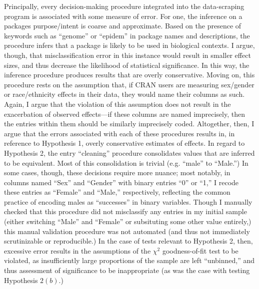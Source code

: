 Principally, every decision-making procedure integrated into the data-scraping program is associated with some measure of error. For one, the inference on a packages purpose/intent is coarse and approximate. Based on the presence of keywords such as ``genome'' or ``epidem'' in package names and descriptions, the procedure infers that a package is likely to be used in biological contexts. I argue, though, that misclassification error in this instance would result in smaller effect sizes, and thus decrease the likelihood of statistical significance. In this way, the inference procedure produces results that are overly conservative. Moving on, this procedure rests on the assumption that, if CRAN users are measuring sex/gender or race/ethnicity effects in their data, they would name their columns as such. Again, I argue that the violation of this assumption does not result in the exacerbation of observed effects---if these columns are named imprecisely, then the entries within them should be similarly imprecisely coded. Altogether, then, I argue that the errors associated with each of these procedures results in, in reference to Hypothesis 1, overly conservative estimates of effects. In regard to Hypothesis 2, the entry ``cleaning'' procedure consolidates values that are inferred to be equivalent. Most of this consolidation is trivial (e.g. ``male'' to ``Male.'') In some cases, though, these decisions require more nuance; most notably, in columns named ``Sex'' and ``Gender'' with binary entries ``0'' or ``1,'' I recode these entries as ``Female'' and ``Male,'' respectively, reflecting the common practice of encoding males as ``successes'' in binary variables. Though I manually checked that this procedure did not misclassify any entries in my initial sample (either switching ``Male'' and ``Female'' or subsituting some other value entirely,) this manual validation procedure was not automated (and thus not immediately scrutinizable or reproducible.) In the case of tests relevant to Hypothesis 2, then, excessive error results in the assumptions of the $\chi^2$ goodness-of-fit test to be violated, as insufficiently large proportions of the sample are left ``unbinned,'' and thus assessment of significance to be inappropriate (as was the case with testing Hypothesis $2(b)$.)

